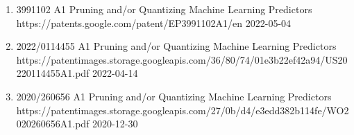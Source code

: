 {
    \ifdefined\shortcv
        {}
    \else
        {
            \begin{enumerate}
                \item [] 
                                        {3991102 A1}
                                        {Pruning and/or Quantizing Machine Learning Predictors}
                                        {https://patents.google.com/patent/EP3991102A1/en}
                                        {2022-05-04}
                \item [] 
                                        {2022/0114455 A1}
                                        {Pruning and/or Quantizing Machine Learning Predictors}
                                        {https://patentimages.storage.googleapis.com/36/80/74/01e3b22ef42a94/US20220114455A1.pdf}
                                        {2022-04-14}
                \item [] 
                                        {2020/260656 A1}
                                        {Pruning and/or Quantizing Machine Learning Predictors}
                                        {https://patentimages.storage.googleapis.com/27/0b/d4/e3edd382b114fe/WO2020260656A1.pdf}
                                        {2020-12-30}
            \end{enumerate}
        }
    \fi
}

